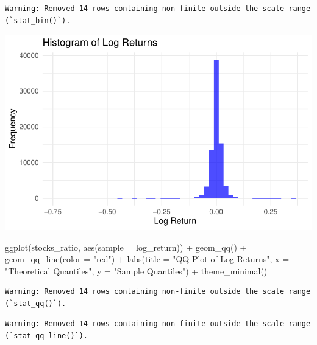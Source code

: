 \documentclass[
  letterpaper,
  DIV=11,
  numbers=noendperiod]{scrartcl}
\newenvironment{Shaded}{\begin{snugshade}}{\end{snugshade}}
\newcommand{\AttributeTok}[1]{\textcolor[rgb]{0.40,0.45,0.13}{#1}}
\newcommand{\FunctionTok}[1]{\textcolor[rgb]{0.28,0.35,0.67}{#1}}
\newcommand{\NormalTok}[1]{\textcolor[rgb]{0.00,0.23,0.31}{#1}}
\newcommand{\SpecialCharTok}[1]{\textcolor[rgb]{0.37,0.37,0.37}{#1}}
\newcommand{\StringTok}[1]{\textcolor[rgb]{0.13,0.47,0.30}{#1}}
\begin{document}
\begin{verbatim}
Warning: Removed 14 rows containing non-finite outside the scale range
(`stat_bin()`).
\end{verbatim}

\includegraphics{Lab4_files/figure-pdf/problem 2-2.pdf}

\begin{Shaded}
\begin{Highlighting}[]
  \FunctionTok{ggplot}\NormalTok{(stocks\_ratio, }\FunctionTok{aes}\NormalTok{(}\AttributeTok{sample =}\NormalTok{ log\_return)) }\SpecialCharTok{+}
  \FunctionTok{geom\_qq}\NormalTok{() }\SpecialCharTok{+}
  \FunctionTok{geom\_qq\_line}\NormalTok{(}\AttributeTok{color =} \StringTok{"red"}\NormalTok{) }\SpecialCharTok{+}
  \FunctionTok{labs}\NormalTok{(}\AttributeTok{title =} \StringTok{"QQ{-}Plot of Log Returns"}\NormalTok{, }\AttributeTok{x =} \StringTok{"Theoretical Quantiles"}\NormalTok{, }\AttributeTok{y =} \StringTok{"Sample Quantiles"}\NormalTok{) }\SpecialCharTok{+}
  \FunctionTok{theme\_minimal}\NormalTok{()}
\end{Highlighting}
\end{Shaded}

\begin{verbatim}
Warning: Removed 14 rows containing non-finite outside the scale range
(`stat_qq()`).
\end{verbatim}

\begin{verbatim}
Warning: Removed 14 rows containing non-finite outside the scale range
(`stat_qq_line()`).
\end{verbatim}
\end{document}
